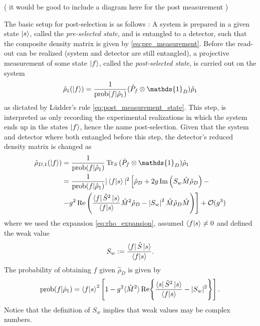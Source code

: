 \documentclass{article}
\newcommand{\Id}{\mathds{1}}
\newcommand\sj[1]{ {\color{orange} #1} }
\begin{document}
(\sj{it would be good to include a diagram here for the post measurement})


The basic setup for post-selection is as follows \cite{svenssonPedagogicalWeak2013}: A system is 
prepared in a given state $\ket{s}$, called the \textit{pre-selected state}, and is entangled to 
a detector, such that the composite density matrix is given by 
\eqref{eq:pre_measurement}. Before the read-out can be realized (system and detector are
still entangled), a projective measurement of some state $\ket{f}$, called the \textit{post-selected state}, is carried out on the system
\begin{align}
    \hat{\rho}_1 (\ket{f}) = \frac{1}{\text{prob}(f|\hat{\rho}_1)} (\hat{P}_f \otimes \Id_D )
    \hat{\rho}_1
\end{align}
as dictated by Lüdder's rule \eqref{eq:post_measurement_state}. This step, is interpreted as only recording the 
experimental realizations in which the system ends up in the states $\ket{f}$, hence the name
post-selection. Given that the system and detector where both entangled before this step,
the detector's reduced density matrix is changed as 
 \begin{align}
    \hat{\rho}_{D,1} (\ket{f}) & = \frac{1}{\text{prob}(f|\hat{\rho}_1)}\Tr_S{(\hat{P}_f \otimes \Id_D )\hat{\rho}_1} \nonumber\\
    & =\frac{1}{\text{prob}(f|\hat{\rho}_1)}|\bra{f} \ket{s}|^2\left[\hat{\rho}_D+2 g \Im\left(S_w \hat{M} \hat{\rho}_D\right)- \right. \\
    &\left. - g^2 \Re\left(\frac{\bra{f} \hat{S}^2\ket{s}}{\bra{f} \ket{s}} \hat{M}^2 \hat{\rho}_D-\left|S_w\right|^2 \hat{M} \hat{\rho}_D \hat{M}\right)\right] + \mathcal{O}(g^3) \nonumber
\end{align}
where we used the expansion \eqref{eq:rho_expansion}, assumed $\bra{f}\ket{s}\neq 0$ and defined the weak value 
\begin{align}
    S_w := \frac{ \bra{f} \hat{S}\ket{s} }{\bra{f}\ket{s}}.
\end{align}
The probability of obtaining $f$ given $\hat{\rho}_D$ is given by 
\begin{align}
    \text{prob}(f|\hat{\rho}_1) = \bra{f}\ket{s}^2 \left[  1- g^2 \langle \hat{M}^2\rangle
        \Re{ \frac{\bra{s} \hat{S}^2\ket{s}}{\bra{f}\ket{s}} - |S_w|^2} \right].
\end{align}
Notice that the definition of $S_w$ implies that weak values may be complex numbers. 
\end{document}
